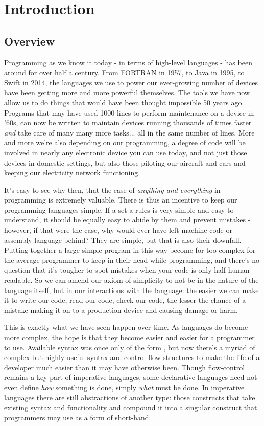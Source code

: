\documentclass{article}
\begin{document}
\section{Introduction}
    \subsection{Overview}
    \label{sec:overview}
        Programming as we know it today - in terms of high-level languages - has been around for over half a century. From FORTRAN in 1957, to Java in 1995, to Swift in 2014, the languages we use to power our ever-growing number of devices have been getting more and more powerful themselves. The tools we have now allow us to do things that would have been thought impossible 50 years ago. Programs that may have used 1000 lines to perform maintenance on a device in '60s, can now be written to maintain devices running thousands of times faster \emph{and} take care of many many more tasks... all in the same number of lines. More and more we're also depending on our programming, a degree of code will be involved in nearly any electronic device you can use today, and not just those devices in domestic settings, but also those piloting our aircraft and cars and keeping our electricity network functioning.

        It's easy to see why then, that the ease of \emph{anything and everything} in programming is extremely valuable. There is thus an incentive to keep our programming languages simple. If a set a rules is very simple and easy to understand, it should be equally easy to abide by them and prevent mistakes - however, if that were the case, why would ever have left machine code or assembly language behind? They are simple, but that is also their downfall. Putting together a large simple program in this way become for too complex for the average programmer to keep in their head while programming, and there's no question that it's tougher to spot mistakes when your code is only half human-readable. So we can amend our axiom of simplicity to not be in the nature of the language itself, but in our interactions with the language: the easier we can make it to write our code, read our code, check our code, the lesser the chance of a mistake making it on to a production device and causing damage or harm. 

        This is exactly what we have seen happen over time. As languages do become more complex, the hope is that they become easier and easier for a programmer to use. Available syntax was once only of the form , but now there's a myriad of complex but highly useful syntax and control flow structures to make the life of a developer much easier than it may have otherwise been. Though flow-control remains a key part of imperative languages, some declarative languages need not even define \emph{how} something is done, simply \emph{what} must be done. In imperative languages there are still abstractions of another type: those constructs that take existing syntax and functionality and compound it into a singular construct that programmers may use as a form of short-hand. 
        
\end{document}
